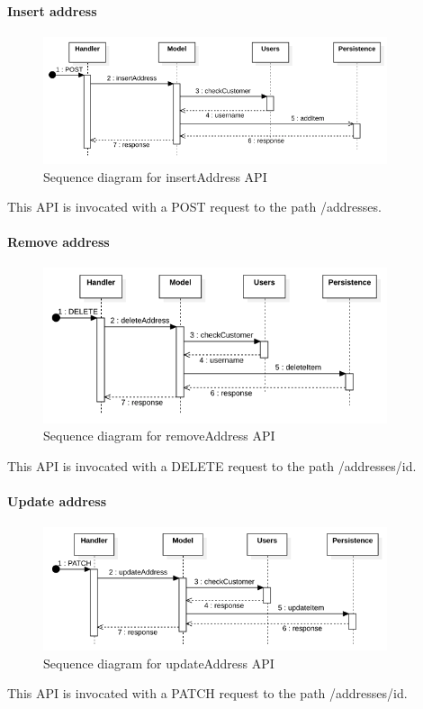 \paragraph*{Insert address}
\begin{figure}[H]
    \includegraphics[width=0.9\textwidth]{res/images/sequence-diagrams/addresses/insertAddress.png}
    \caption{Sequence diagram for insertAddress API}
\end{figure}
This API is invocated with a POST request to the path /addresses.

\paragraph*{Remove address}
\begin{figure}[H]
    \includegraphics[width=0.9\textwidth]{res/images/sequence-diagrams/addresses/removeAddress.png}
    \caption{Sequence diagram for removeAddress API}
\end{figure}
This API is invocated with a DELETE request to the path /addresses/{id}.

\paragraph*{Update address}
\begin{figure}[H]
    \includegraphics[width=0.9\textwidth]{res/images/sequence-diagrams/addresses/updateAddress.png}
    \caption{Sequence diagram for updateAddress API}
\end{figure}
This API is invocated with a PATCH request to the path /addresses/{id}.


